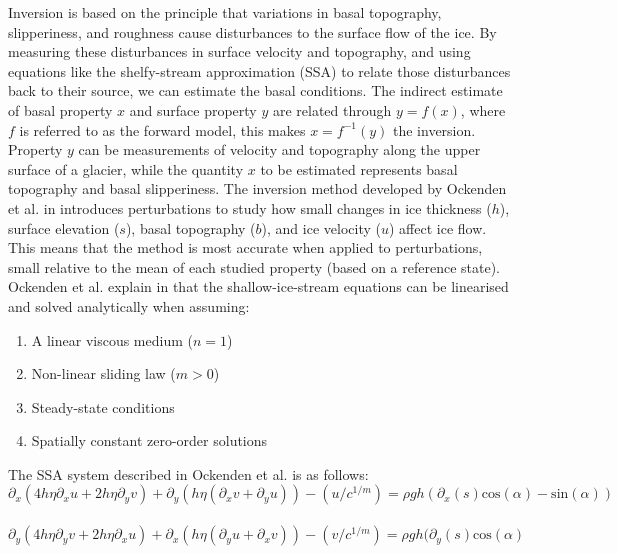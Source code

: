 Inversion is based on the principle that variations in basal topography, slipperiness, and roughness cause disturbances to the surface flow of the ice. By measuring these disturbances in surface velocity and topography, and using equations like the shelfy-stream approximation (SSA) to relate those disturbances back to their source, we can estimate the basal conditions.
The indirect estimate of basal property $x$ and surface property $y$ are related through $y=f(x)$, where $f$ is referred to as the forward model, this makes  $x=f^{-1}(y)$ the inversion. Property $y$ can be measurements of velocity and topography along the upper surface of a glacier, while the quantity $x$ to be estimated represents basal topography and basal slipperiness\cite{Gudmundsson_2008}.
The inversion method developed by Ockenden et al. in\cite{Ockenden_2022} introduces perturbations to study how small changes in ice thickness ($h$), surface elevation ($s$), basal topography ($b$), and ice velocity ($u$) affect ice flow. This means that the method is most accurate when applied to perturbations, small relative to the mean of each studied property (based on a reference state). Ockenden et al. explain in\cite{Ockenden_2022} that the shallow-ice-stream equations can be linearised and solved analytically when assuming:
\begin{enumerate}
\item A linear viscous medium ($n=1$)
\item Non-linear sliding law ($m>0$)
\item Steady-state conditions
\item Spatially constant zero-order solutions
\end{enumerate}

The SSA system described in Ockenden et al.\cite{Ockenden_2022} is as follows:
\begin{equation}\partial_{x} (4 h \eta \partial_{x} u + 2 h \eta \partial_y v) + \partial_{y}(h \eta( \partial_{x} v + \partial_{y} u)) - (u/c^{1/m}) = \rho g h ( \partial_{x} (s) \mathrm{cos}(\alpha) - \mathrm{sin}(\alpha))
\end{equation}\label{eq:2.1}\\
\begin{equation}\partial_{y} (4 h \eta \partial_{y} v + 2 h \eta \partial_x u) + \partial_{x}(h \eta( \partial_{y} u + \partial_{x} v)) - (v/c^{1/m}) = \rho g h ( \partial_{y} (s) \mathrm{cos}(\alpha)
\end{equation}\label{eq:2.2}

